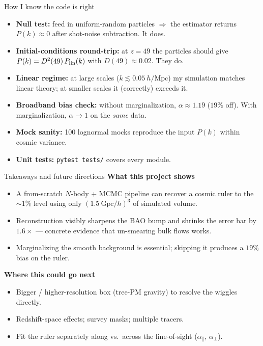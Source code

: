 \documentclass[aspectratio=169,11pt]{beamer}
\begin{document}
\begin{frame}{How I know the code is right}
  \small
  \begin{itemize}\itemsep0.3em
    \item \textbf{Null test:} feed in uniform-random particles
      $\Rightarrow$ the estimator returns $P(k) \approx 0$ after
      shot-noise subtraction. \alert{It does.}
    \item \textbf{Initial-conditions round-trip:} at $z=49$ the
      particles should give $P(k) = D^2(49)\,P_{\rm lin}(k)$ with
      $D(49)\approx 0.02$. \alert{They do.}
    \item \textbf{Linear regime:} at large scales
      ($k \lesssim 0.05~h/\mathrm{Mpc}$) my simulation matches
      linear theory; at smaller scales it (correctly) exceeds it.
    \item \textbf{Broadband bias check:} without marginalization,
      $\alpha \approx 1.19$ ($19\%$ off). With marginalization,
      $\alpha \to 1$ on the \emph{same} data.
    \item \textbf{Mock sanity:} 100 lognormal mocks reproduce the
      input $P(k)$ within cosmic variance.
    \item \textbf{Unit tests:} \texttt{pytest tests/} covers every
      module.
  \end{itemize}
\end{frame}

\begin{frame}{Takeaways and future directions}
  \textbf{What this project shows}
  \begin{itemize}\itemsep0.25em
    \item A from-scratch $N$-body + MCMC pipeline can recover a
          cosmic ruler to the $\sim\!1\%$ level using only
          $(1.5~\mathrm{Gpc}/h)^3$ of simulated volume.
    \item Reconstruction visibly sharpens the BAO bump and
          shrinks the error bar by $1.6\times$ --- concrete
          evidence that un-smearing bulk flows works.
    \item Marginalizing the smooth background is \alert{essential};
          skipping it produces a $19\%$ bias on the ruler.
  \end{itemize}

  \smallskip
  \textbf{Where this could go next}
  \begin{itemize}\itemsep0.25em
    \item Bigger / higher-resolution box (tree-PM gravity) to
          resolve the wiggles directly.
    \item Redshift-space effects; survey masks; multiple tracers.
    \item Fit the ruler separately along vs.\ across the
          line-of-sight ($\alpha_\parallel$, $\alpha_\perp$).
  \end{itemize}
\end{frame}
\end{document}
